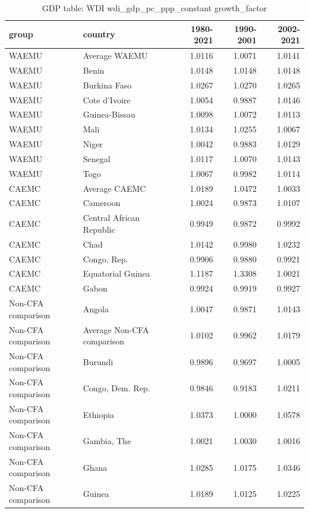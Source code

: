 \begin{table}

\caption{GDP table: WDI wdi_gdp_pc_ppp_constant growth_factor}
\centering
\begin{tabular}[t]{llrrr}
\toprule
group & country & 1980-2021 & 1990-2001 & 2002-2021\\
\midrule
WAEMU & Average WAEMU & 1.0116 & 1.0071 & 1.0141\\
WAEMU & Benin & 1.0148 & 1.0148 & 1.0148\\
WAEMU & Burkina Faso & 1.0267 & 1.0270 & 1.0265\\
WAEMU & Cote d'Ivoire & 1.0054 & 0.9887 & 1.0146\\
WAEMU & Guinea-Bissau & 1.0098 & 1.0072 & 1.0113\\
\addlinespace
WAEMU & Mali & 1.0134 & 1.0255 & 1.0067\\
WAEMU & Niger & 1.0042 & 0.9883 & 1.0129\\
WAEMU & Senegal & 1.0117 & 1.0070 & 1.0143\\
WAEMU & Togo & 1.0067 & 0.9982 & 1.0114\\
CAEMC & Average CAEMC & 1.0189 & 1.0472 & 1.0033\\
\addlinespace
CAEMC & Cameroon & 1.0024 & 0.9873 & 1.0107\\
CAEMC & Central African Republic & 0.9949 & 0.9872 & 0.9992\\
CAEMC & Chad & 1.0142 & 0.9980 & 1.0232\\
CAEMC & Congo, Rep. & 0.9906 & 0.9880 & 0.9921\\
CAEMC & Equatorial Guinea & 1.1187 & 1.3308 & 1.0021\\
\addlinespace
CAEMC & Gabon & 0.9924 & 0.9919 & 0.9927\\
Non-CFA comparison & Angola & 1.0047 & 0.9871 & 1.0143\\
Non-CFA comparison & Average Non-CFA comparison & 1.0102 & 0.9962 & 1.0179\\
Non-CFA comparison & Burundi & 0.9896 & 0.9697 & 1.0005\\
Non-CFA comparison & Congo, Dem. Rep. & 0.9846 & 0.9183 & 1.0211\\
\addlinespace
Non-CFA comparison & Ethiopia & 1.0373 & 1.0000 & 1.0578\\
Non-CFA comparison & Gambia, The & 1.0021 & 1.0030 & 1.0016\\
Non-CFA comparison & Ghana & 1.0285 & 1.0175 & 1.0346\\
Non-CFA comparison & Guinea & 1.0189 & 1.0125 & 1.0225\\

\end{tabular}
\end{table}
